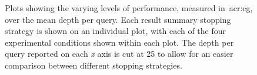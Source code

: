 \begin{figure}[p!]
    \centering
    \caption[Stopping strategies, conditions and \emph{what-if} performance]{Plots showing the varying levels of performance, measured in~\gls{acr:cg}, over the mean depth per query. Each result summary stopping strategy is shown on an individual plot, with each of the four experimental conditions shown within each plot. The depth per query reported on each \emph{x} axis is cut at 25 to allow for an easier comparison between different stopping strategies.}
    \label{fig:ch8_sim_perf_plots}
\end{figure}

